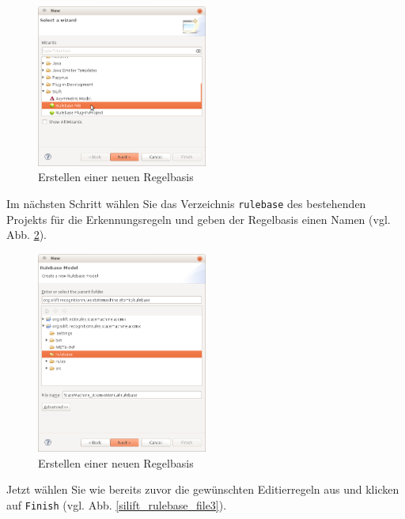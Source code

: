 \documentclass[a4paper]{scrartcl}
\begin{document}
\begin{figure}[H]
\centering
\includegraphics[width=0.5\textwidth]{graphics/silift-rulebase_file1.png}
\caption{Erstellen einer neuen Regelbasis}
\label{silift_rulebase_file1}
\end{figure}

Im nächsten Schritt wählen Sie das Verzeichnis \texttt{rulebase} des bestehenden Projekts für die Erkennungsregeln und geben der Regelbasis einen Namen (vgl. Abb. \ref{silift_rulebase_file2}).

\begin{figure}[H]
\centering
\includegraphics[width=0.5\textwidth]{graphics/silift-rulebase_file2.png}
\caption{Erstellen einer neuen Regelbasis}
\label{silift_rulebase_file2}
\end{figure}

Jetzt wählen Sie wie bereits zuvor die gewünschten Editierregeln aus und klicken auf \texttt{Finish} (vgl. Abb. \ref{silift_rulebase_file3}).
\end{document}
